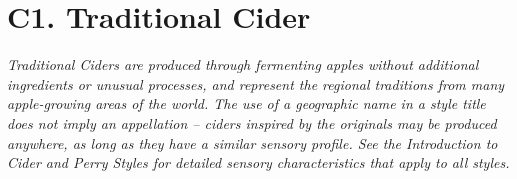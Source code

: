 \section*{C1. Traditional Cider}
\textit{Traditional Ciders are produced through fermenting apples without additional ingredients or unusual processes, and represent the regional traditions from many apple-growing areas of the world. The use of a geographic name in a style title does not imply an appellation – ciders inspired by the originals may be produced anywhere, as long as they have a similar sensory profile. See the Introduction to Cider and Perry Styles for detailed sensory characteristics that apply to all styles.}